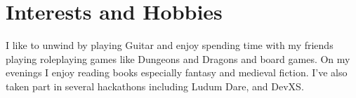 \documentclass[10pt]{article}
\begin{document}
\section*{Interests and Hobbies}
I like to unwind by playing Guitar and enjoy spending time with my friends playing roleplaying games like Dungeons and Dragons and board games. On my evenings I enjoy reading books especially fantasy and medieval fiction. I've also taken part in several hackathons including Ludum Dare, and DevXS.
\end{document}
